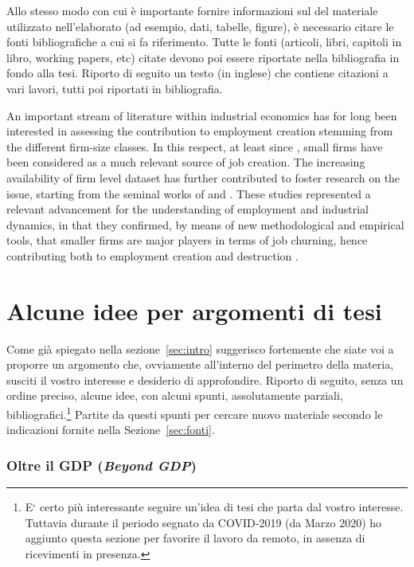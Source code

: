 \documentclass[12pt]{article}
\begin{document}
Allo stesso modo con cui \`e importante fornire informazioni sul del
materiale utilizzato nell'elaborato (ad esempio, dati, tabelle,
figure), \`e necessario citare le fonti bibliografiche a cui si fa
riferimento. Tutte le fonti (articoli, libri, capitoli in libro,
working papers, etc) citate devono poi essere riportate nella
bibliografia in fondo alla tesi. Riporto di seguito un testo (in
inglese) che contiene citazioni a vari lavori, tutti poi riportati in
bibliografia. 

\vspace{0.3cm}

\small{An important stream of literature within industrial
  economics has for long been interested in assessing the contribution
  to employment creation stemming from the different firm-size
  classes. In this respect, at least since \cite{birch_1981}, small
  firms have been considered as a much relevant source of job
  creation. The increasing availability of firm level dataset has
  further contributed to foster research on the issue, starting from
  the seminal works of \cite{davis_haltiwanger_1992} and
  \cite{davis_etal_1996}. These studies represented a relevant
  advancement for the understanding of employment and industrial
  dynamics, in that they confirmed, by means of new methodological and
  empirical tools, that smaller firms are major players in terms of
  job churning, hence contributing both to employment creation and
  destruction \citep[among the others, also refer
  to][]{davis_haltiwanger_1995}.}


\section{Alcune idee per argomenti di tesi}\label{sec:idee-tesi}
Come gi\`a spiegato nella sezione~\ref{sec:intro} suggerisco
fortemente che siate voi a proporre un argomento che, ovviamente
all'interno del perimetro della materia, susciti il vostro interesse e
desiderio di approfondire. Riporto di seguito, senza un ordine
preciso, alcune idee, con alcuni spunti, assolutamente parziali,
bibliografici.\footnote{E` certo pi\`u interessante seguire un'idea di
  tesi che parta dal vostro interesse. Tuttavia durante il periodo
  segnato da COVID-2019 (da Marzo 2020) ho aggiunto questa sezione per
  favorire il lavoro da remoto, in assenza di ricevimenti in
  presenza.} Partite da questi spunti per cercare nuovo materiale
secondo le indicazioni fornite nella Sezione~\ref{sec:fonti}.


\subsubsection*{Oltre il GDP (\textit{Beyond GDP})}
\end{document}
